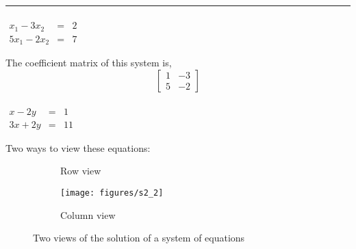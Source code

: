 \rule[0.01in]{\textwidth}{0.0025in}









\begin{example}
$ \begin{array}{rcl}& & \\ x_1 - 3x_2 & = & 2 \\ 5x_1 - 2 x_2 & = & 7 \end{array}$

The coefficient matrix of this system is, 
\[  \begin{bmatrix}
1 & -3 \\ 5 & -2 
\end{bmatrix}
\]
\end{example}


\begin{example}
$ \begin{array}{rcl}& & \\ x - 2y & = & 1 \\ 3x + 2 y & = &11 \end{array}$

Two ways to view these equations:


\begin{figure}[h!]
\centering
\begin{subfigure}{.5\textwidth}
  \centering


  \caption{Row view}
  \label{fig:sub1}
\end{subfigure}%
\begin{subfigure}{.5\textwidth}
  \centering

   \texttt{[image: figures/s2\_2]} 

  \caption{Column view}
  \label{fig:sub2}
\end{subfigure}
\caption{Two views of the solution of a system of equations}
\label{fig:system2}
\end{figure}


\end{example}



